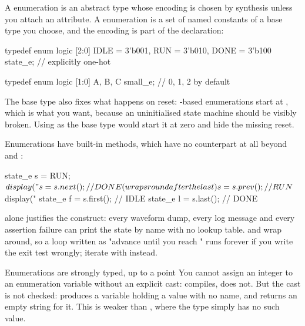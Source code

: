 A \VHDL{} enumeration is an abstract type whose encoding is chosen by
synthesis unless you attach an attribute. A \SV{} enumeration is a set of
named constants of a base type you choose, and the encoding is part of the
declaration:

\begin{svcode}
typedef enum logic [2:0] {
  IDLE = 3'b001, RUN = 3'b010, DONE = 3'b100
} state_e;                       // explicitly one-hot

typedef enum logic [1:0] { A, B, C } small_e;  // 0, 1, 2 by default
\end{svcode}

The base type also fixes what happens on reset: -based
enumerations start at , which is what you want, because an
uninitialised state machine should be visibly broken. Using  as the
base type would start it at zero and hide the missing reset.

Enumerations have built-in methods, which have no \VHDL{} counterpart at all
beyond  and :

\begin{svcode}
state_e s = RUN;
$display("%
s = s.next();               // DONE   (wraps round after the last)
s = s.prev();               // RUN
$display("%
state_e f = s.first();      // IDLE
state_e l = s.last();       // DONE
\end{svcode}

 alone justifies the construct: every waveform dump, every
log message and every assertion failure can print the state by name with no
lookup table.  and  wrap around, so a loop written
as "advance until you reach " runs forever if you write the exit
test wrongly; iterate with  instead.

\begin{notebox}{Enumerations are strongly typed, up to a point}
You cannot assign an integer to an enumeration variable without an explicit
cast:  compiles,  does not. But the cast is
not checked:  produces a variable holding a value
with no name, and  returns an empty string for it. This is
weaker than \VHDL{}, where the type simply has no such value.
\end{notebox}


